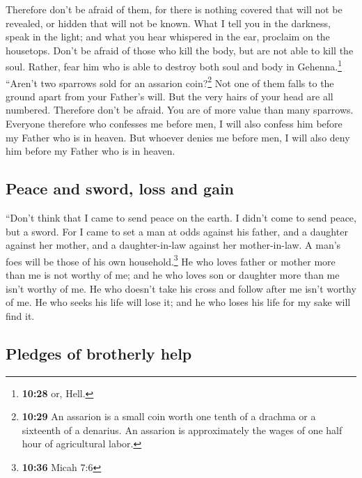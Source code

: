 \begin{paracol}{2}
\begin{otherlanguage}{english}
 Therefore don't be afraid of them, for there is nothing
covered that will not be revealed, or hidden that will not be known.
 What I tell you in the darkness, speak in the light; and
what you hear whispered in the ear, proclaim on the housetops.
 Don't be afraid of those who kill the body, but are not
able to kill the soul. Rather, fear him who is able to destroy both soul
and body in Gehenna.\footnote{\textbf{10:28} or, Hell.} 
``Aren't two sparrows sold for an assarion coin?\footnote{\textbf{10:29}
  An assarion is a small coin worth one tenth of a drachma or a
  sixteenth of a denarius. An assarion is approximately the wages of one
  half hour of agricultural labor.} Not one of them falls to the ground
apart from your Father's will.  But the very hairs of
your head are all numbered.  Therefore don't be afraid.
You are of more value than many sparrows.  Everyone
therefore who confesses me before men, I will also confess him before my
Father who is in heaven.  But whoever denies me before
men, I will also deny him before my Father who is in heaven.

\hypertarget{peace-and-sword-loss-and-gain}{%
\subsection{Peace and sword, loss and
gain}\label{peace-and-sword-loss-and-gain}}

 ``Don't think that I came to send peace on the earth. I
didn't come to send peace, but a sword.  For I came to
set a man at odds against his father, and a daughter against her mother,
and a daughter-in-law against her mother-in-law.  A man's
foes will be those of his own household.\footnote{\textbf{10:36} Micah
  7:6}  He who loves father or mother more than me is not
worthy of me; and he who loves son or daughter more than me isn't worthy
of me.  He who doesn't take his cross and follow after me
isn't worthy of me.  He who seeks his life will lose it;
and he who loses his life for my sake will find it.

\hypertarget{pledges-of-brotherly-help}{%
\subsection{Pledges of brotherly help}\label{pledges-of-brotherly-help}}


\end{otherlanguage}
\end{paracol}
